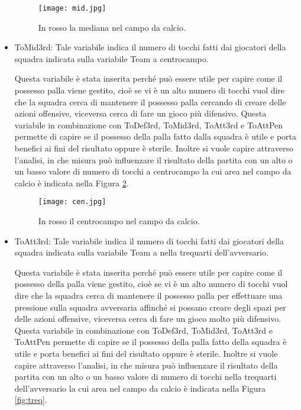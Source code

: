 \begin{itemize}
	\begin{figure}[!ht]
		\begin{center}
			\texttt{[image: mid.jpg]}
			\caption{In rosso la mediana nel campo da calcio.} 
			\label{fig:def}
		\end{center}
	\end{figure}
	\item \textsf{ToMid3rd}: Tale variabile indica il numero di tocchi fatti dai giocatori della squadra indicata sulla variabile \textsf{Team} a centrocampo. 
	
	Questa variabile è stata inserita perché può essere utile per capire come il possesso palla viene gestito, cioè se vi è un alto numero di tocchi vuol dire che la squadra cerca di mantenere il possesso palla cercando di creare delle azioni offensive, viceversa cerca di fare un gioco più difensivo. Questa variabile in combinazione con \textsf{ToDef3rd}, \textsf{ToMid3rd}, \textsf{ToAtt3rd} e \textsf{ToAttPen} permette di capire se il possesso della palla fatto dalla squadra è utile e porta benefici ai fini del risultato oppure è sterile. Inoltre si vuole capire attraverso l'analisi, in che misura può influenzare il risultato della partita con un alto o un basso valore di numero di tocchi a centrocampo la cui area nel campo da calcio è indicata nella Figura \ref{fig:cen}.
	
	\begin{figure}[!ht]
		\begin{center}
			\texttt{[image: cen.jpg]}
			\caption{In rosso il centrocampo nel campo da calcio.}
			\label{fig:cen}
		\end{center}
	\end{figure}
	
	\item \textsf{ToAtt3rd}: Tale variabile indica il numero di tocchi fatti dai giocatori della squadra indicata sulla variabile \textsf{Team} a nella trequarti dell'avversario. 
	
	Questa variabile è stata inserita perché può essere utile per capire come il possesso della palla viene gestito, cioè se vi è un alto numero di tocchi vuol dire che la squadra cerca di mantenere il possesso palla per effettuare una pressione sulla squadra avversaria affinché si possano creare degli spazi per delle azioni offensive, viceversa cerca di fare un gioco molto più difensivo. Questa variabile in combinazione con \textsf{ToDef3rd}, \textsf{ToMid3rd}, \textsf{ToAtt3rd} e \textsf{ToAttPen} permette di capire se il possesso della palla fatto della squadra è utile e porta benefici ai fini del risultato oppure è sterile. Inoltre si vuole capire attraverso l'analisi, in che misura può influenzare il risultato della partita con un alto o un basso valore di numero di tocchi nella trequarti dell'avversario la cui area nel campo da calcio è indicata nella Figura \ref{fig:treq}.
	

\end{itemize}
